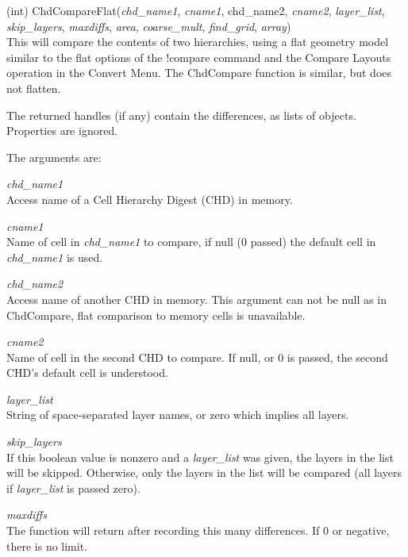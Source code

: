\begin{description}
\item{(int) \vt ChdCompareFlat({\it chd\_name1\/}, {\it cname1\/},
 {\vt chd\_name2\/}, {\it cname2\/}, {\it layer\_list\/}, {\it skip\_layers\/},
 \newline
 {\it maxdiffs\/}, {\it area\/}, {\it coarse\_mult\/}, {\it find\_grid\/},
 {\it array\/})}\\
This will compare the contents of two hierarchies, using a flat
geometry model similar to the flat options of the {\cb !compare}
command and the {\cb Compare Layouts} operation in the {\cb Convert
Menu}.  The {\vt ChdCompare} function is similar, but does not
flatten.

The returned handles (if any) contain the differences, as lists of
objects.  Properties are ignored.

The arguments are:
\begin{description}
\item{\it chd\_name1}\\
Access name of a Cell Hierarchy Digest (CHD) in memory.

\item{\it cname1}\\
Name of cell in {\it chd\_name1} to compare, if null (0 passed) the
default cell in {\it chd\_name1} is used.

\item{\it chd\_name2}\\
Access name of another CHD in memory.  This argument can not be null
as in {\vt ChdCompare}, flat comparison to memory cells is
unavailable.

\item{\it cname2}\\
Name of cell in the second CHD to compare.  If null, or 0 is passed,
the second CHD's default cell is understood.

\item{\it layer\_list}\\
String of space-separated layer names, or zero which implies all
layers.

\item{\it skip\_layers}\\
If this boolean value is nonzero and a {\it layer\_list} was given,
the layers in the list will be skipped.  Otherwise, only the layers in
the list will be compared (all layers if {\it layer\_list} is passed
zero).

\item{\it maxdiffs}\\
The function will return after recording this many differences.  If 0
or negative, there is no limit.


\end{description}
\end{description}
